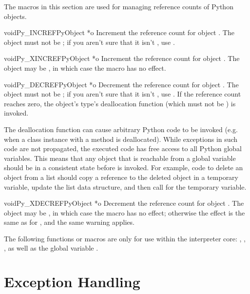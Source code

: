 \documentclass{manual}
\begin{document}
The macros in this section are used for managing reference counts
of Python objects.

\begin{cfuncdesc}{void}{Py_INCREF}{PyObject *o}
Increment the reference count for object .  The object must
not be \NULL{}; if you aren't sure that it isn't \NULL{}, use
.
\end{cfuncdesc}

\begin{cfuncdesc}{void}{Py_XINCREF}{PyObject *o}
Increment the reference count for object .  The object may be
\NULL{}, in which case the macro has no effect.
\end{cfuncdesc}

\begin{cfuncdesc}{void}{Py_DECREF}{PyObject *o}
Decrement the reference count for object .  The object must
not be \NULL{}; if you aren't sure that it isn't \NULL{}, use
.  If the reference count reaches zero, the
object's type's deallocation function (which must not be \NULL{}) is
invoked.

 The deallocation function can cause arbitrary Python
code to be invoked (e.g. when a class instance with a
 method is deallocated).  While exceptions in such
code are not propagated, the executed code has free access to all
Python global variables.  This means that any object that is reachable
from a global variable should be in a consistent state before
 is invoked.  For example, code to delete an
object from a list should copy a reference to the deleted object in a
temporary variable, update the list data structure, and then call
 for the temporary variable.
\end{cfuncdesc}

\begin{cfuncdesc}{void}{Py_XDECREF}{PyObject *o}
Decrement the reference count for object .  The object may be
\NULL{}, in which case the macro has no effect; otherwise the effect
is the same as for , and the same warning
applies.
\end{cfuncdesc}

The following functions or macros are only for use within the
interpreter core: ,
, , as
well as the global variable .


\chapter{Exception Handling \label{exceptionHandling}}
\end{document}
